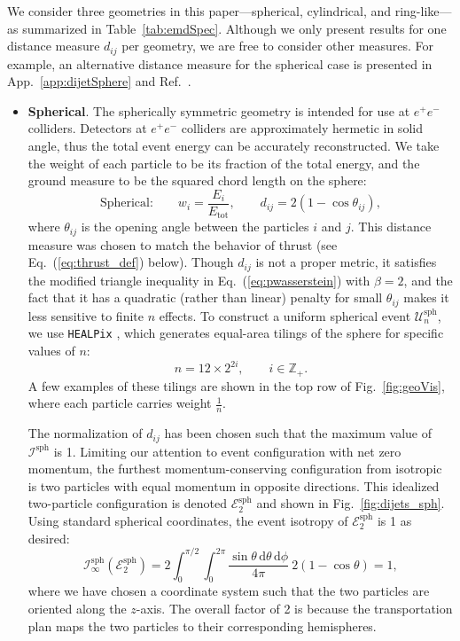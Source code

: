 \documentclass[letterpaper,11pt]{article}
\newcommand{\iso}[2]{\mathcal{I}^\text{#1}_{#2}}
\DeclareRobustCommand{\App}[1]{App.~\ref{#1}}
\DeclareRobustCommand{\Tab}[1]{Table~\ref{#1}}
\DeclareRobustCommand{\Fig}[1]{Fig.~\ref{#1}}
\DeclareRobustCommand{\Eq}[1]{Eq.~(\ref{#1})}
\DeclareRobustCommand{\Ref}[1]{Ref.~\cite{#1}}
\begin{document}
We consider three geometries in this paper---spherical, cylindrical, and ring-like---as summarized in \Tab{tab:emdSpec}. 
%
Although we only present results for one distance measure $d_{ij}$ per geometry, we are free to consider other measures. 
%
For example, an alternative distance measure for the spherical case is presented in \App{app:dijetSphere} and \Ref{cesarotti:2020mm}.
%
\begin{itemize}
\item \textbf{Spherical}.  The spherically symmetric geometry is intended for use at $e^+e^-$ colliders.
%
Detectors at $e^+e^-$ colliders are approximately hermetic in solid angle, thus the total event energy can be accurately reconstructed.
%
We take the weight of each particle to be its fraction of the total energy, and the ground measure to be the squared chord length on the sphere:
%
\begin{equation}
\label{eq:spherical_metric}
\boxed{\text{Spherical:}} \qquad  w_i = \frac{E_i}{E_\text{tot}}, \qquad d_{ij} = 2 \left( 1 - \cos \theta_{ij} \right),
\end{equation}
%
where $\theta_{ij}$ is the opening angle between the particles $i$ and $j$.
%
This distance measure was chosen to match the behavior of thrust (see \Eq{eq:thrust_def} below).
%
Though $d_{ij}$ is not a proper metric, it satisfies the modified triangle inequality in \Eq{eq:pwasserstein} with $\beta = 2$, and the fact that it has a quadratic (rather than linear) penalty for small $\theta_{ij}$ makes it less sensitive to finite $n$ effects.
%
To construct a uniform spherical event $\mathcal{U}_n^\text{sph}$, we use \texttt{HEALPix} \cite{Gorski:2004by}, which generates equal-area tilings of the sphere for specific values of $n$:
%
\begin{equation}
\label{eq:HEALPixN}
n = 12\times{2}^{2i}, \qquad i \in \mathbb{Z}_+.
\end{equation} 
%
A few examples of these tilings are shown in the top row of \Fig{fig:geoVis}, where each particle carries weight $\frac{1}{n}$.


The normalization of $d_{ij}$ has been chosen such that the maximum value of $\iso{sph}{}$ is 1.
%
Limiting our attention to event configuration with net zero momentum, the furthest momentum-conserving configuration from isotropic is two particles with equal momentum in opposite directions.
%
This idealized two-particle configuration is denoted $\mathcal{E}^\text{sph}_2$ and shown in \Fig{fig:dijets_sph}.
%
Using standard spherical coordinates, the event isotropy of $\mathcal{E}^\text{sph}_2$ is 1 as desired:
%
\begin{equation}
\label{eq:computeMaxIsoSpherical}
\iso{sph}{\infty}(\mathcal{E}^\text{sph}_2)= 2 \int_0^{\pi/2} \int_0^{2\pi} \frac{\sin \theta \, \text{d} \theta \, \text{d} \phi}{4\pi} \ 2 \left( 1 - \cos \theta \right) = 1,
\end{equation}
%
where we have chosen a coordinate system such that the two particles are oriented along the $z$-axis.
%
The overall factor of 2 is because the transportation plan maps the two particles to their corresponding hemispheres.



\end{itemize}
\end{document}
